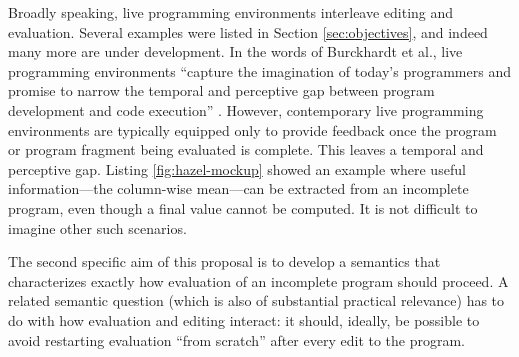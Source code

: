 Broadly speaking, live programming environments interleave editing and evaluation. 
Several examples were listed in Section \ref{sec:objectives}, and indeed many more
are under development. In the words of Burckhardt et al., live programming environments 
``capture the imagination of today's programmers and promise to narrow the temporal and perceptive gap 
between program development and code execution'' \cite{burckhardt2013s}. However,
contemporary live programming environments are typically equipped only to provide feedback once the program or 
program fragment being evaluated is complete. This leaves a temporal and perceptive gap. Listing \ref{fig:hazel-mockup} showed an example where
useful information---the column-wise mean---can be extracted from an incomplete program, even though a final value cannot be computed. It is not difficult to imagine other such scenarios.

The second specific aim of this proposal is to develop a semantics that characterizes exactly how
evaluation of an incomplete program should proceed. A related semantic question (which is also of 
substantial practical relevance) has to do with how 
evaluation and editing interact: it should, ideally, be possible to avoid restarting
evaluation ``from scratch'' after every edit to the program.


